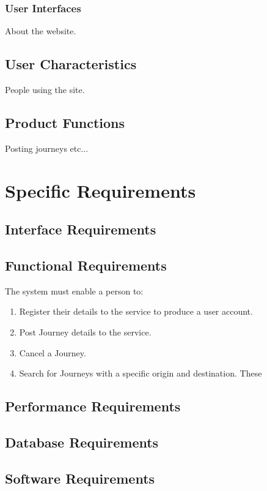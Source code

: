 \documentclass[11pt]{article}
\begin{document}
\subsubsection{User Interfaces}
About the website.
\subsection{User Characteristics}
People using the site.
\subsection{Product Functions}
Posting journeys etc...

\section{Specific Requirements}
\subsection{Interface Requirements}
\subsection{Functional Requirements}
The system must enable a person to:
\begin{enumerate}
\item Register their details to the service to produce a user account.
\item Post Journey details to the service.
\item Cancel a Journey.
\item Search for Journeys with a specific origin and destination. These

\end{enumerate}
\subsection{Performance Requirements}
\subsection{Database Requirements}
\subsection{Software Requirements}
\end{document}
